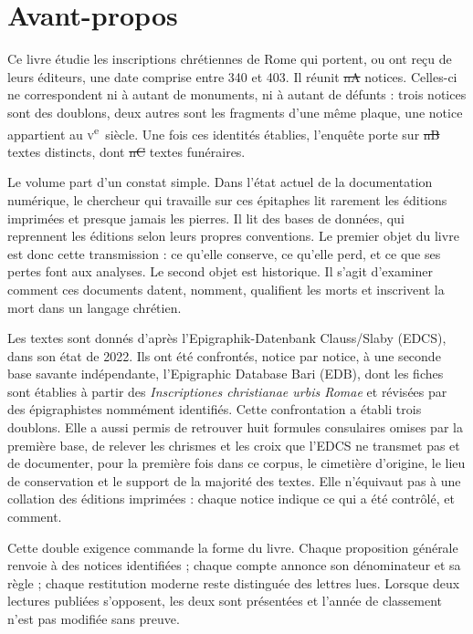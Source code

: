 \chapter*{Avant-propos}

Ce livre étudie les inscriptions chrétiennes de Rome qui portent, ou ont reçu de leurs éditeurs, une date comprise entre 340 et 403. Il réunit \st{nA} notices. Celles-ci ne correspondent ni à autant de monuments, ni à autant de défunts : trois notices sont des doublons, deux autres sont les fragments d’une même plaque, une notice appartient au \textsc{v}\textsuperscript{e}~siècle. Une fois ces identités établies, l’enquête porte sur \st{nB} textes distincts, dont \st{nC} textes funéraires.

Le volume part d’un constat simple. Dans l’état actuel de la documentation numérique, le chercheur qui travaille sur ces épitaphes lit rarement les éditions imprimées et presque jamais les pierres. Il lit des bases de données, qui reprennent les éditions selon leurs propres conventions. Le premier objet du livre est donc cette transmission : ce qu’elle conserve, ce qu’elle perd, et ce que ses pertes font aux analyses. Le second objet est historique. Il s’agit d’examiner comment ces documents datent, nomment, qualifient les morts et inscrivent la mort dans un langage chrétien.

Les textes sont donnés d’après l’Epigraphik-Datenbank Clauss/Slaby (EDCS), dans son état de 2022. Ils ont été confrontés, notice par notice, à une seconde base savante indépendante, l’Epigraphic Database Bari (EDB), dont les fiches sont établies à partir des \emph{Inscriptiones christianae urbis Romae} et révisées par des épigraphistes nommément identifiés. Cette confrontation a établi trois doublons. Elle a aussi permis de retrouver huit formules consulaires omises par la première base, de relever les chrismes et les croix que l’EDCS ne transmet pas et de documenter, pour la première fois dans ce corpus, le cimetière d’origine, le lieu de conservation et le support de la majorité des textes. Elle n’équivaut pas à une collation des éditions imprimées : chaque notice indique ce qui a été contrôlé, et comment.

Cette double exigence commande la forme du livre. Chaque proposition générale renvoie à des notices identifiées ; chaque compte annonce son dénominateur et sa règle ; chaque restitution moderne reste distinguée des lettres lues. Lorsque deux lectures publiées s’opposent, les deux sont présentées et l’année de classement n’est pas modifiée sans preuve.

